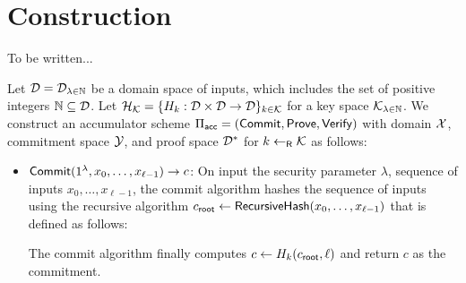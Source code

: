 \section{Construction}

To be written...

\newcommand{\RecursiveHash}{\ms{RecursiveHash}}
\newcommand{\RecursiveVerify}{\ms{RecursiveVerify}}
\newcommand{\croot}{c_{\ms{root}}}
\newcommand{\cleft}{c_{\ms{left}}}
\newcommand{\cright}{c_{\ms{right}}}
\newcommand{\midi}{\ms{mid}}
\newcommand{\RecursiveProve}{\ms{RecursiveProve}}
\newcommand{\tagleft}{\ms{L}}
\newcommand{\tagright}{\ms{R}}

\begin{construction}
  \label{cons:main}
  Let $\mathcal{D} = \mathcal{D}_{\lambda \in \mathbb{N}}$ be a domain space of inputs, which
  includes the set of positive integers $\mathbb{N} \subseteq \mathcal{D}$. Let $\mathcal{H}_{\mathcal{K}} =
  \{ H_k: \mathcal{D} \times \mathcal{D} \to \mathcal{D}\}_{k \in \mathcal{K}}$ for a key space
  $\mathcal{K}_{\lambda \in \mathbb{N}}$. We construct an accumulator scheme $\Pi_{\mathsf{acc}} =
  (\mathsf{Commit}, \mathsf{Prove}, \mathsf{Verify})$ with domain $\mathcal{X}$, commitment space $\mathcal{Y}$, and
  proof space $\mathcal{D}^*$ for $k \gets_{\mathsf{R}} \mathcal{K}$ as follows:
  \begin{itemize}
    \item $\mathsf{Commit}(1^\lambda, x_0, \ldots, x_{\ell-1}) \to c$: On input the
      security parameter $\lambda$, sequence of inputs $x_0, \ldots,
      x_{\ell-1}$, the commit algorithm hashes the sequence of inputs using
      the recursive algorithm $\croot \gets \RecursiveHash(x_0, \ldots,
      x_{\ell-1})$ that is defined as follows:
      The commit algorithm finally computes $c \gets H_k(\croot, \ell)$ and return
      $c$ as the commitment.


\end{itemize}
\end{construction}
